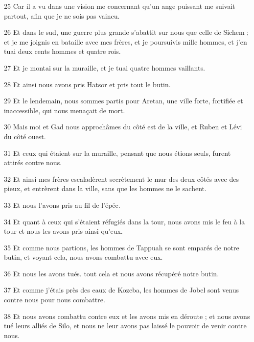 \par 25 Car il a vu dans une vision me concernant qu'un ange puissant me suivait partout, afin que je ne sois pas vaincu.

\par 26 Et dans le sud, une guerre plus grande s'abattit sur nous que celle de Sichem ; et je me joignis en bataille avec mes frères, et je poursuivis mille hommes, et j'en tuai deux cents hommes et quatre rois.

\par 27 Et je montai sur la muraille, et je tuai quatre hommes vaillants.

\par 28 Et ainsi nous avons pris Hatsor et pris tout le butin.

\par 29 Et le lendemain, nous sommes partis pour Aretan, une ville forte, fortifiée et inaccessible, qui nous menaçait de mort.

\par 30 Mais moi et Gad nous approchâmes du côté est de la ville, et Ruben et Lévi du côté ouest.

\par 31 Et ceux qui étaient sur la muraille, pensant que nous étions seuls, furent attirés contre nous.

\par 32 Et ainsi mes frères escaladèrent secrètement le mur des deux côtés avec des pieux, et entrèrent dans la ville, sans que les hommes ne le sachent.

\par 33 Et nous l'avons pris au fil de l'épée.

\par 34 Et quant à ceux qui s'étaient réfugiés dans la tour, nous avons mis le feu à la tour et nous les avons pris ainsi qu'eux.

\par 35 Et comme nous partions, les hommes de Tappuah se sont emparés de notre butin, et voyant cela, nous avons combattu avec eux.

\par 36 Et nous les avons tués. tout cela et nous avons récupéré notre butin.

\par 37 Et comme j'étais près des eaux de Kozeba, les hommes de Jobel sont venus contre nous pour nous combattre.

\par 38 Et nous avons combattu contre eux et les avons mis en déroute ; et nous avons tué leurs alliés de Silo, et nous ne leur avons pas laissé le pouvoir de venir contre nous.

